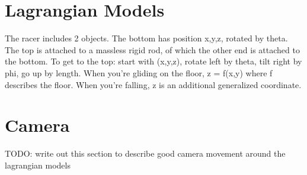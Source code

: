 \documentclass{article}
\begin{document}
\section{Lagrangian Models}
The racer includes 2 objects.
The bottom has position x,y,z, rotated by theta.
The top is attached to a massless rigid rod, of which the other end is attached to the bottom.
To get to the top: start with (x,y,z), rotate left by theta, tilt right by phi, go up by length.
When you're gliding on the floor, z = f(x,y) where f describes the floor.
When you're falling, z is an additional generalized coordinate.

\newpage



\section{Camera}
TODO: write out this section to describe good camera movement around the lagrangian models

\label{end}
\end{document}
